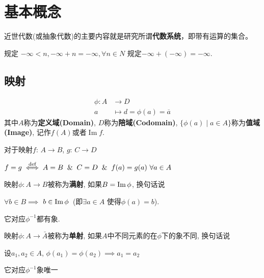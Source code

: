 \section{基本概念}


\begin{Note}
近世代数(或抽象代数)的主要内容就是研究所谓\textbf{代数系统}，即带有运算的集合。
\end{Note}

\begin{Note}
规定
$-\infty < n, -\infty + n = -\infty, \forall n \in N$
 规定$-\infty + (-\infty) = -\infty$.
\end{Note}

\subsection{映射}

\begin{Definition}[映射]
$$ \begin{aligned}
\phi: A &\rightarrow D \\
a &\mapsto d = \phi (a) = \overline{a} \end{aligned}$$ 
其中$A$称为\textbf{定义域(Domain)}, $D$称为\textbf{陪域(Codomain)}, $\{ \phi(a) \mid a \in A \}$称为\textbf{值域(Image)}, 记作$f(A)$或者$\mathop{\text{Im}}f$.
\end{Definition}

\begin{Definition}
对于映射$f$: $A \rightarrow B$, $g$: $C \rightarrow D$
\begin{tightcenter}
$f = g  \stackrel{\text{def}}{\iff} A = B \And C = D \And f(a) = g(a)~\forall a \in A$
\end{tightcenter}
\end{Definition}

\begin{Definition}[满射]
映射$\phi: A \rightarrow B$被称为\textbf{满射}, 如果$B = \operatorname{Im}{\phi}$, 换句话说
\begin{tightcenter}
$\forall b \in B \implies$ $b \in \operatorname{Im}{\phi}$~(即$\exists a \in A$ 使得$\phi{(a)} = b$).
\end{tightcenter}
它对应$\phi^{-1}$都有象.
\end{Definition}

\begin{Definition}[单射]
映射$\phi: A \rightarrow \bar{A}$被称为\textbf{单射}, 如果$A$中不同元素的在$\phi$下的象不同, 换句话说
\begin{tightcenter}
设$a_1, a_2 \in A$, $\phi(a_1) = \phi(a_2) \implies a_1 = a_2$
\end{tightcenter}
它对应$\phi^{-1}$象唯一
\end{Definition}


